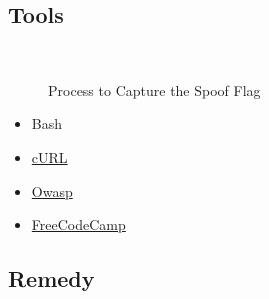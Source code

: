 \subsection{Tools}

\begin{figure}[!htb]
    \centering
     \quad
     \\
     \quad
    \caption[Flag 05 Method]{Process to Capture the Spoof Flag} %
    \label{fig:flag05 method}
\end{figure}

\begin{itemize}
    \item Bash
    \item \href{https://curl.haxx.se/docs/manpage.html}{cURL}
    \item \href{https://owasp.org/www-community/attacks/Content_Spoofing}{Owasp}
    \item \href{https://www.freecodecamp.org/news/how-to-start-using-curl-and-why-a-hands-on-introduction-ea1c913caaaa/}{FreeCodeCamp}
\end{itemize}

\subsection{Remedy}

